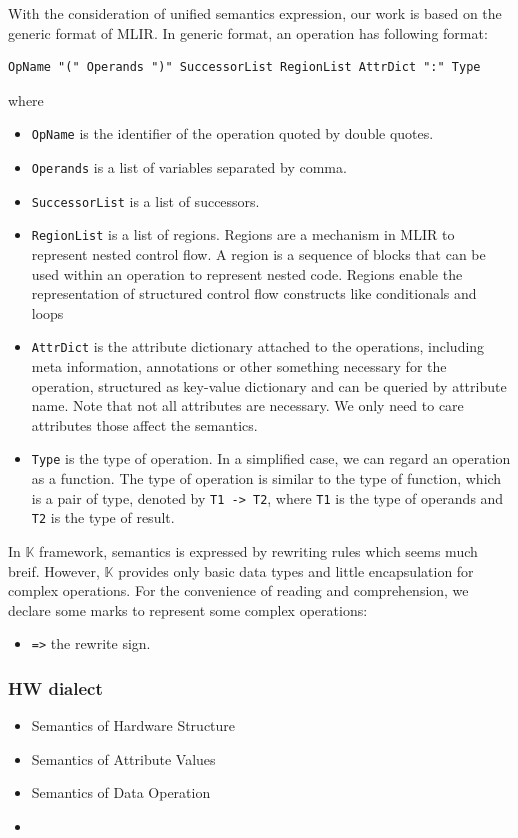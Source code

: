 With the consideration of unified semantics expression, our work is based on the generic format of MLIR. In generic format, an operation has following format:

\begin{lstlisting}
OpName "(" Operands ")" SuccessorList RegionList AttrDict ":" Type
\end{lstlisting}
where
\begin{itemize}
    \item \verb|OpName| is the identifier of the operation quoted by double quotes.
    \item \verb|Operands| is a list of variables separated by comma.
    \item \verb|SuccessorList| is a list of successors.
    \item \verb|RegionList| is a list of regions. Regions are a mechanism in MLIR to represent nested control flow. A region is a sequence of blocks that can be used within an operation to represent nested code. Regions enable the representation of structured control flow constructs like conditionals and loops
    \item \verb|AttrDict| is the attribute dictionary attached to the operations, including meta information, annotations or other something necessary for the operation, structured as key-value dictionary and can be queried by attribute name. Note that not all attributes are necessary. We only need to care attributes those affect the semantics.
    \item \verb|Type| is the type of operation. In a simplified case, we can regard an operation as a function. The type of operation is similar to the type of function, which is a pair of type, denoted by \verb|T1 -> T2|, where \verb|T1| is the type of operands and \verb|T2| is the type of result.
\end{itemize}

In $\mathbb{K}$ framework, semantics is expressed by rewriting rules which seems much breif. However, $\mathbb{K}$ provides only basic data types and little encapsulation for complex operations. For the convenience of reading and comprehension, we declare some marks to represent some complex operations:
\begin{itemize}
    \item \verb|=>| the rewrite sign.
\end{itemize}

\subsubsection{HW dialect}
\begin{itemize}
    \item Semantics of Hardware Structure
    \item Semantics of Attribute Values
    \item Semantics of Data Operation
    \item 
\end{itemize}

